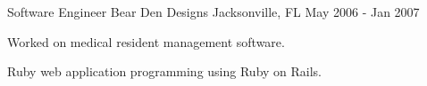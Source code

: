 \begin{cventries}
  \cventry
    {Software Engineer} %
    {Bear Den Designs} %
    {Jacksonville, FL} %
    {May 2006 - Jan 2007} %
    {
      \begin{cvitems} %
        \item {Worked on medical resident management software.}
        \item {Ruby web application programming using Ruby on Rails.}
      \end{cvitems}
    }

\end{cventries}
